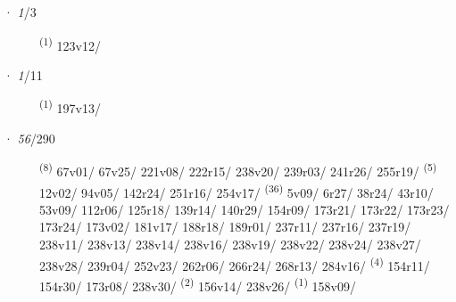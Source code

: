 \ENTRYEND
\noindent{} · \textit{1}/3 \LEMMALINE
\begin{description}
    \item[]  \textsuperscript{(1)} \mbox{123v12/}
\end{description}
\ENTRYEND
\noindent{} · \textit{1}/11 \LEMMALINE
\begin{description}
    \item[]  \textsuperscript{(1)} \mbox{197v13/}
\end{description}
\ENTRYEND
\noindent{} · \textit{56}/290 \LEMMALINE
\begin{description}
    \item[]  \textsuperscript{(8)} \mbox{67v01/} \mbox{67v25/} \mbox{221v08/} \mbox{222r15/} \mbox{238v20/} \mbox{239r03/} \mbox{241r26/} \mbox{255r19/} \CASEBREAK {} \textsuperscript{(5)} \mbox{12v02/} \mbox{94v05/} \mbox{142r24/} \mbox{251r16/} \mbox{254v17/} \CASEBREAK {} \textsuperscript{(36)} \mbox{5v09/} \mbox{6r27/} \mbox{38r24/} \mbox{43r10/} \mbox{53v09/} \mbox{112r06/} \mbox{125r18/} \mbox{139r14/} \mbox{140r29/} \mbox{154r09/} \mbox{173r21/} \mbox{173r22/} \mbox{173r23/} \mbox{173r24/} \mbox{173v02/} \mbox{181v17/} \mbox{188r18/} \mbox{189r01/} \mbox{237r11/} \mbox{237r16/} \mbox{237r19/} \mbox{238v11/} \mbox{238v13/} \mbox{238v14/} \mbox{238v16/} \mbox{238v19/} \mbox{238v22/} \mbox{238v24/} \mbox{238v27/} \mbox{238v28/} \mbox{239r04/} \mbox{252v23/} \mbox{262r06/} \mbox{266r24/} \mbox{268r13/} \mbox{284v16/} \textsuperscript{(4)} \mbox{154r11/} \mbox{154r30/} \mbox{173r08/} \mbox{238v30/} \textsuperscript{(2)} \mbox{156v14/} \mbox{238v26/} \textsuperscript{(1)} \mbox{158v09/}
\end{description}
